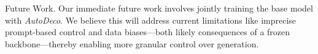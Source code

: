 Future Work. Our immediate future work involves jointly training the base model with \textit{AutoDeco}. We believe this will address current limitations like imprecise prompt-based control and data biases—both likely consequences of a frozen backbone—thereby enabling more granular control over generation.

\clearpage
\newpage




\clearpage
\newpage




